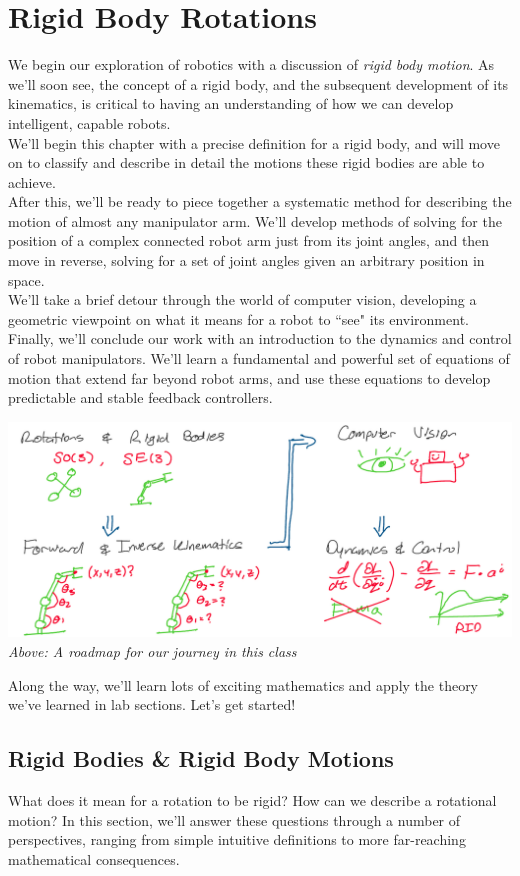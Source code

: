 \documentclass[oneside]{book}
\begin{document}
\section{Rigid Body Rotations}
We begin our exploration of robotics with a discussion of \textit{rigid body motion}. As we'll soon see, the concept of a rigid body, and the subsequent development of its kinematics, is critical to having an understanding of how we can develop intelligent, capable robots.\\
We'll begin this chapter with a precise definition for a rigid body, and will move on to classify and describe in detail the motions these rigid bodies are able to achieve.\\
After this, we'll be ready to piece together a systematic method for describing the motion of almost any manipulator arm. We'll develop methods of solving for the position of a complex connected robot arm just from its joint angles, and then move in reverse, solving for a set of joint angles given an arbitrary position in space.\\
We'll take a brief detour through the world of computer vision, developing a geometric viewpoint on what it means for a robot to ``see" its environment.\\
Finally, we'll conclude our work with an introduction to the dynamics and control of robot manipulators. We'll learn a fundamental and powerful set of equations of motion that extend far beyond robot arms, and use these equations to develop predictable and stable feedback controllers.
\begin{center}
    \includegraphics[scale=0.25]{images/roadmap.png}\\
    \textit{Above: A roadmap for our journey in this class}
\end{center}
Along the way, we'll learn lots of exciting mathematics and apply the theory we've learned in lab sections. Let's get started!

\subsection{Rigid Bodies \& Rigid Body Motions}
What does it mean for a rotation to be rigid? How can we describe a rotational motion? In this section, we'll answer these questions through a number of perspectives, ranging from simple intuitive definitions to more far-reaching mathematical consequences.
\end{document}
